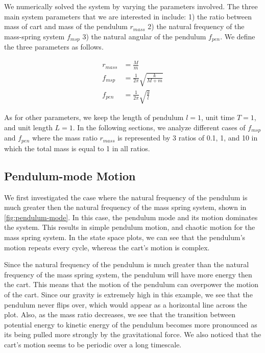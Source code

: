 \documentclass[12pt]{article}
\begin{document}
We numerically solved the system by varying the parameters involved. The three main system parameters that we are interested in include: 1) the ratio between mass of cart and mass of the pendulum $r_{mass}$ 2) the natural frequency of the mass-spring system $f_{msp}$ 3) the natural angular of the pendulum $f_{pen}$. We define the three parameters as follows.

\begin{align}
    r_{mass} &= \frac{M}{m} \\
    f_{msp} &= \frac{1}{2\pi}\sqrt{\frac{k}{M+m}} \\
    f_{pen} &= \frac{1}{2\pi}\sqrt{\frac{g}{l}}
\end{align}

As for other parameters, we keep the length of pendulum $l = 1$, unit time $T = 1$, and unit length $L = 1$. In the following sections, we analyze different cases of $f_{msp}$ and $f_{pen}$ where the mass ratio $r_{mass}$ is represented by 3 ratios of 0.1, 1, and 10 in which the total mass is equal to 1 in all ratios.

\subsection{Pendulum-mode Motion}

We first investigated the case where the natural frequency of the pendulum is much greater then the natural frequency of the mass spring system, shown in \autoref{fig:pendulum-mode}. In this case, the pendulum mode and its motion dominates the system. This results in simple pendulum motion, and chaotic motion for the mass spring system. In the state space plots, we can see that the pendulum's motion repeats every cycle, whereas the cart's motion is complex.

Since the natural frequency of the pendulum is much greater than the natural frequency of the mass spring system, the pendulum will have more energy then the cart. This means that the motion of the pendulum can overpower the motion of the cart. Since our gravity is extremely high in this example, we see that the pendulum never flips over, which would appear as a horizontal line across the plot. Also, as the mass ratio decreases, we see that the transition between potential energy to kinetic energy of the pendulum becomes more pronounced as its being pulled more strongly by the gravitational force. We also noticed that the cart's motion seems to be periodic over a long timescale.
\end{document}
